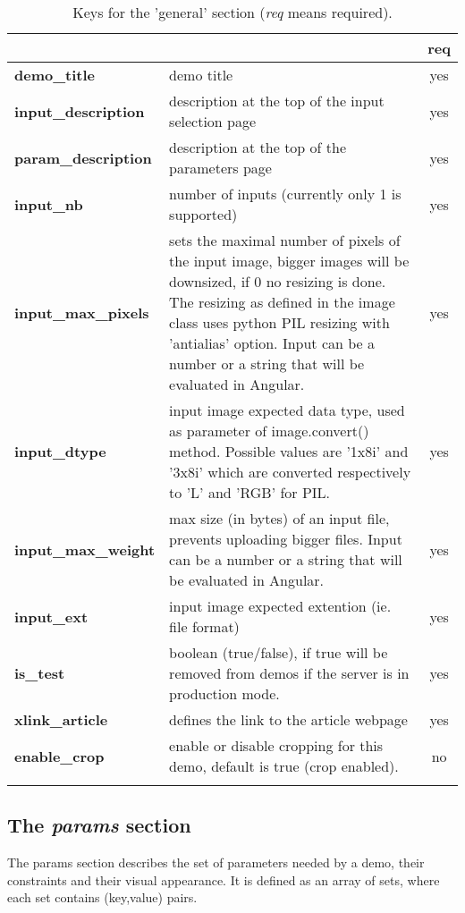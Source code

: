 \begin{longtable}{|>{\bf}L{\linewidth}|L{\linewidth}|c|}
\hline
      &  & {\bf req} 
\tabularnewline \hline \hline
 demo\_title         & demo title & yes\\ \hline
 input\_description  & description at the top of the input selection page 
                     & yes \\ \hline
 param\_description  & description at the top of the para\-meters page & yes
                      \\ \hline
 input\_nb           & number of inputs (currently only 1 is supported) & yes\\ 
\hline
 input\_max\_pixels & sets the maximal number of pixels of the input image, 
bigger images will be downsized, if 0 no resizing is done. The resizing as 
defined in the image class uses python PIL resizing with 'antialias' option. 
Input can be a number or a string that will be evaluated in Angular. & 
yes  \\ \hline
 input\_dtype       & input image expected data type, used as parameter of 
image.convert() method. Possible values are '1x8i' and '3x8i' which are 
converted respectively to 'L' and 'RGB' for PIL.& yes  \\ \hline
 input\_max\_weight & max size (in bytes) of an input file, prevents uploading 
bigger files. Input can be a number or a string that will be evaluated in Angular.
                    & yes  \\ \hline
 input\_ext         & input image expected extention (ie. file format) & yes  
\\ \hline
 is\_test           & boolean (true/false), if true will be removed from demos 
if the server is in production mode.& yes  \\ \hline
 xlink\_article     & defines the link to the article webpage & yes  \\ \hline
 enable\_crop       & enable or disable cropping for this demo, default is true (crop enabled). & no   \\ \hline
\caption{Keys for the 'general' section ({\em req} means required).}
\end{longtable}

\subsection{The \emph{params} section}
The params section describes the set of parameters needed by a demo, their 
constraints and their visual appearance. It is defined as an array of sets, 
where each set contains (key,value) pairs.

